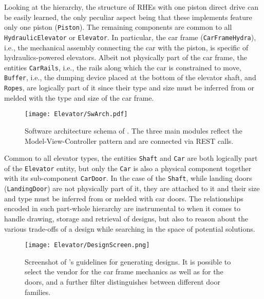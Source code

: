Looking at the hierarchy, the structure of RHEs with one piston direct
drive can be easily learned, the only peculiar aspect being that these
implements feature only one piston (\texttt{Piston}). The remaining 
components are common to all \texttt{HydraulicElevator} or \texttt{Elevator}.
In particular, the car frame (\texttt{CarFrameHydra}), i.e., the mechanical
assembly connecting the car with the piston, is specific of hydraulics-powered
elevators. Albeit not physically part of the car frame, the entities
\texttt{CarRails}, i.e., the rails along which the car is constrained to
move, \texttt{Buffer}, i.e., the dumping device placed at the bottom of the
elevator shaft, and \texttt{Ropes}, are logically part of it since their 
type and size must be inferred from or melded with the type and size of the
car frame.

\begin{figure}
	\caption{\label{fig:sw-arch} Software architecture schema of \liftcreate.
		The three main modules reflect the Model-View-Controller pattern and
		are connected via REST calls.}
	\centering
	\texttt{[image: Elevator/SwArch.pdf]}
\end{figure}

Common to all elevator types, the entities \texttt{Shaft} and \texttt{Car} are
both logically part of the \texttt{Elevator} entity, but only the \texttt{Car}
is also a physical component together with its sub-component \texttt{CarDoor}.
In the case of the \texttt{Shaft}, while landing doors (\texttt{LandingDoor})
are not physically part of it, they are attached to it and their size and type
must be inferred from or melded with car doors. The relationships encoded in
such part-whole hierarchy are instrumental to \liftcreate{} when it comes to
handle drawing, storage and retrieval of designs, but also to reason about
the various trade-offs of a design while searching in the space of potential
solutions.

\begin{figure}[t]
	\caption{\label{fig:liftcreate_1} Screenshot of \liftcreate's guidelines
		for generating designs. It is possible to select the vendor for the
		car frame mechanics as well as for the doors, and a further filter
		distinguishes between different door families.}
	\centering
	\texttt{[image: Elevator/DesignScreen.png]}
\end{figure}

